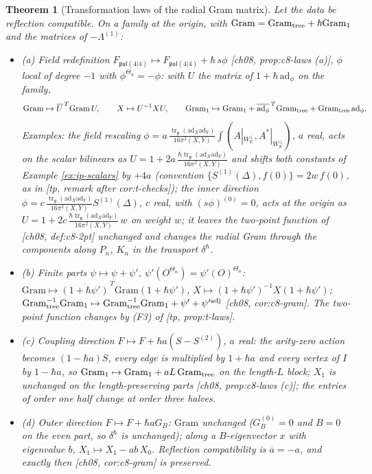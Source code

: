 \documentclass[11pt]{report}
\theoremstyle{plain}
\newtheorem{theorem}{Theorem}[chapter]
\theoremstyle{definition}
\numberwithin{equation}{chapter}
\newcommand{\unit}{\tfrac{\hbar\operatorname{tr}_{\mathfrak g}(\mathrm{ad}_X\mathrm{ad}_Y)}{16\pi^2(X,Y)}}
\newcommand{\Wp}{W_{\mathbb R}^\perp}
\newcommand{\Gt}{\mathrm{Gram}_{\rm tree}}
\newcommand{\Go}{\mathrm{Gram}_{1}}
\begin{document}
\begin{theorem}[Transformation laws of the radial Gram matrix]
\label{thm:ip-laws}
Let the data be reflection compatible. On a family at the origin, with $\mathrm{Gram}=\Gt+\hbar\Go$ and the matrices of $-\Lambda^{(1)}$:
\begin{itemize}
\item (a) Field redefinition $F_{\mathfrak{psl}(4|4)}\mapsto F_{\mathfrak{psl}(4|4)}+\hbar\,s\phi$ [ch08, prop:c8-laws (a)], $\phi$ local of degree $-1$ with $\phi^{\Theta_n}=-\phi$: with $U$ the matrix of $1+\hbar\,\mathrm{ad}_\phi$ on the family,
\[
\mathrm{Gram}\mapsto\overline U^{\,T}\mathrm{Gram}\,U,\qquad X\mapsto U^{-1}XU,\qquad \Go\mapsto\Go+\overline{\mathrm{ad}_\phi}^{\,T}\Gt+\Gt\,\mathrm{ad}_\phi .
\]
Examples: the field rescaling $\phi=a\,\frac{\operatorname{tr}_{\mathfrak g}(\mathrm{ad}_X\mathrm{ad}_Y)}{16\pi^2(X,Y)}\int(A|_{\Wp},A^*|_{\Wp})$, $a$ real, acts on the scalar bilinears as $U=1+2a\,\unit$ and shifts both constants of Example \ref{ex:ip-scalars} by $+4a$ (convention $\{S^{(1)}(\Delta),f(0)\}=2w\,f(0)$, as in [tp, remark after cor:t-checks]); the inner direction $\phi=c\,\frac{\operatorname{tr}_{\mathfrak g}(\mathrm{ad}_X\mathrm{ad}_Y)}{16\pi^2(X,Y)}S^{(1)}(\Delta)$, $c$ real, with $(s\phi)^{(0)}=0$, acts at the origin as $U=1+2c\,\unit\,w$ on weight $w$; it leaves the two-point function of [ch08, def:c8-2pt] unchanged and changes the radial Gram through the components along $P_n$, $K_n$ in the transport $\delta^\hbar$.
\item (b) Finite parts $\psi\mapsto\psi+\psi'$, $\psi'(O^{\Theta_n})=\psi'(O)^{\Theta_n}$: $\mathrm{Gram}\mapsto\overline{(1+\hbar\psi')}^{\,T}\mathrm{Gram}(1+\hbar\psi')$, $X\mapsto(1+\hbar\psi')^{-1}X(1+\hbar\psi')$; $\Gt^{-1}\Go\mapsto\Gt^{-1}\Go+\psi'+\psi'^{\rm adj}$ [ch08, cor:c8-gram]. The two-point function changes by (F3) of [tp, prop:t-laws].
\item (c) Coupling direction $F\mapsto F+\hbar a(S-S^{(2)})$, $a$ real: the arity-zero action becomes $(1-\hbar a)S$, every edge is multiplied by $1+\hbar a$ and every vertex of $I$ by $1-\hbar a$, so $\Go\mapsto\Go+aL\,\Gt$ on the length-$L$ block; $X_1$ is unchanged on the length-preserving parts [ch08, prop:c8-laws (c)]; the entries of order one half change at order three halves.
\item (d) Outer direction $F\mapsto F+\hbar aG_B$: $\mathrm{Gram}$ unchanged ($G_B^{(0)}=0$ and $B=0$ on the even part, so $\delta^\hbar$ is unchanged); along a $B$-eigenvector $x$ with eigenvalue $b$, $X_1\mapsto X_1-ab\,X_0$. Reflection compatibility is $\overline a=-a$, and exactly then [ch08, cor:c8-gram] is preserved.

\end{itemize}
\end{theorem}
\end{document}
